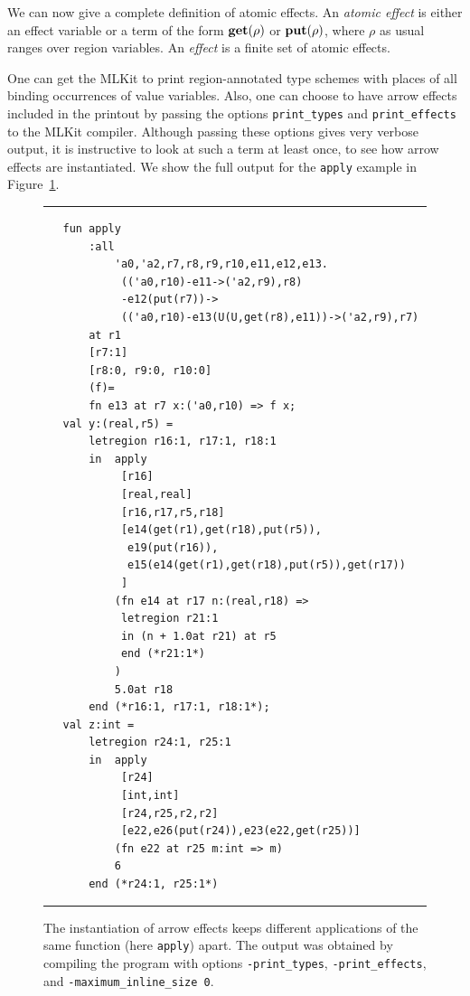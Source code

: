\documentclass[12pt]{book}
\begin{document}
We can now give a complete definition of atomic effects.  An
%
{\em atomic effect\/} is either an effect variable or a term of the
form $\mathop{\bf get}\nolimits(\rho)$ or $\mathop{\bf put}\nolimits(\rho)$, where $\rho$ as usual ranges over
region variables. An 
%
{\em effect\/} is a finite set of atomic effects.

One can get the MLKit to print region-annotated 
%
%
type schemes with places of all binding occurrences of value
variables.  Also, one can choose to have arrow effects included in the
printout by passing the options \texttt{print\_types} and
\texttt{print\_effects} to the MLKit compiler. Although passing these
options gives very verbose output, it is instructive to look at such a
term at least once, to see how arrow effects are instantiated. We show
the full output for the {\tt apply} example in Figure~\ref{apply.fig}.

\begin{figure}
\hrule \medskip
\begin{verbatim} 
   fun apply 
       :all 
           'a0,'a2,r7,r8,r9,r10,e11,e12,e13.
            (('a0,r10)-e11->('a2,r9),r8)
            -e12(put(r7))->
            (('a0,r10)-e13(U(U,get(r8),e11))->('a2,r9),r7) 
       at r1 
       [r7:1] 
       [r8:0, r9:0, r10:0] 
       (f)= 
       fn e13 at r7 x:('a0,r10) => f x; 
   val y:(real,r5) = 
       letregion r16:1, r17:1, r18:1 
       in  apply
            [r16] 
            [real,real] 
            [r16,r17,r5,r18] 
            [e14(get(r1),get(r18),put(r5)),
             e19(put(r16)),
             e15(e14(get(r1),get(r18),put(r5)),get(r17))
            ] 
           (fn e14 at r17 n:(real,r18) => 
            letregion r21:1 
            in (n + 1.0at r21) at r5 
            end (*r21:1*)
           ) 
           5.0at r18 
       end (*r16:1, r17:1, r18:1*); 
   val z:int = 
       letregion r24:1, r25:1 
       in  apply
            [r24] 
            [int,int] 
            [r24,r25,r2,r2] 
            [e22,e26(put(r24)),e23(e22,get(r25))] 
           (fn e22 at r25 m:int => m) 
           6 
       end (*r24:1, r25:1*)
\end{verbatim}
\caption{The instantiation of arrow effects keeps different applications of
  the same function (here {\tt apply}) apart. The output was obtained
  by compiling the program  with options
  \texttt{-print\_types}, \texttt{-print\_effects}, and
  \texttt{-maximum\_inline\_size 0}.}  \medskip \hrule
\label{apply.fig}
\end{figure}
\end{document}
